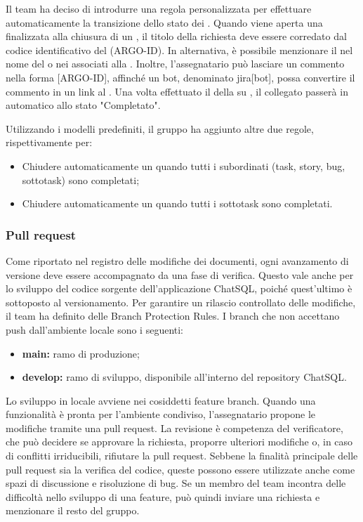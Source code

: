 \vspace{0.5\baselineskip}
\par Il team ha deciso di introdurre una regola personalizzata per effettuare automaticamente la transizione dello stato dei . Quando viene aperta una  finalizzata alla chiusura di un , il titolo della richiesta deve essere corredato dal codice identificativo del  (ARGO-ID). In alternativa, è possibile menzionare il  nel nome del  o nei  associati alla . Inoltre, l’assegnatario può lasciare un commento nella forma [ARGO-ID], affinché un bot, denominato jira[bot], possa convertire il commento in un link al  . Una volta effettuato il  della  su , il  collegato passerà in automatico allo stato "Completato".
\par Utilizzando i modelli predefiniti, il gruppo ha aggiunto altre due regole, rispettivamente per:
\begin{itemize}
  \item Chiudere automaticamente un  quando tutti i  subordinati (task, story, bug, sottotask) sono completati;
  \item Chiudere automaticamente un  quando tutti i sottotask sono completati.
\end{itemize}

\subsubsection{Pull request}
Come riportato nel registro delle modifiche dei documenti, ogni avanzamento di versione deve essere accompagnato da una fase di verifica. Questo vale anche per lo sviluppo del codice sorgente dell'applicazione ChatSQL, poiché quest'ultimo è sottoposto al versionamento. Per garantire un rilascio controllato delle modifiche, il team ha definito delle Branch Protection Rules. I branch che non accettano push dall’ambiente locale sono i seguenti: 
\begin{itemize}
  \item \textbf{main:} ramo di produzione;
  \item \textbf{develop:} ramo di sviluppo, disponibile all'interno del repository ChatSQL.
\end{itemize}
\par Lo sviluppo in locale avviene nei cosiddetti feature branch. Quando una funzionalità è pronta per l'ambiente condiviso, l'assegnatario propone le modifiche tramite una pull request. La revisione è competenza del verificatore, che può decidere se approvare la richiesta, proporre ulteriori modifiche o, in caso di conflitti irriducibili, rifiutare la pull request. Sebbene la finalità principale delle pull request sia la verifica del codice, queste possono essere utilizzate anche come spazi di discussione e risoluzione di bug. Se un membro del team incontra delle difficoltà nello sviluppo di una feature, può quindi inviare una richiesta e menzionare il resto del gruppo.

